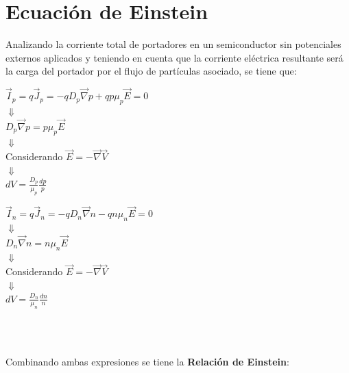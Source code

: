 \documentclass[oneside]{book}
\numberwithin{equation}{section}
\numberwithin{figure}{section}
\numberwithin{table}{section}
\begin{document}
		\section{Ecuación de Einstein}	
		
			Analizando la corriente total de portadores en un semiconductor sin potenciales externos aplicados y teniendo en cuenta que la corriente eléctrica resultante será la carga del portador por el flujo de partículas asociado, se tiene que:\\
			
			\begin{minipage}[t]{0.4\textwidth}
				\begin{center}
					$\displaystyle \vec{I}_p=q\vec{J}_p=-qD_p\vec{\nabla}p+qp\mu_p\vec{E}=0$\\
					$\Downarrow$\\
					$\displaystyle D_p\vec{\nabla}p=p\mu_p\vec{E}$\\
					$\Downarrow$\\
					Considerando $\displaystyle \vec{E}=-\vec{\nabla} \vec{V}$\\
					$\Downarrow$\\
					$\displaystyle dV=\frac{D_p}{\mu_p}\frac{dp}{p}$\\
				\end{center}
			\end{minipage}
			\begin{minipage}[t]{0.4\textwidth}
				\begin{center}
					$\displaystyle \vec{I}_n=q\vec{J}_n=-qD_n\vec{\nabla}n-qn\mu_n\vec{E}=0$\\
					$\Downarrow$\\
					$\displaystyle D_n\vec{\nabla}n=n\mu_n\vec{E}$\\
					$\Downarrow$\\
					Considerando $\displaystyle \vec{E}=-\vec{\nabla} \vec{V}$\\
					$\Downarrow$\\
					$\displaystyle dV=\frac{D_n}{\mu_n}\frac{dn}{n}$\\
				\end{center}
			\end{minipage}
			\\
			\\
			\begin{center}
				Combinando ambas expresiones se tiene la \textbf{Relación de Einstein}:\\
			\end{center}
		
\end{document}
